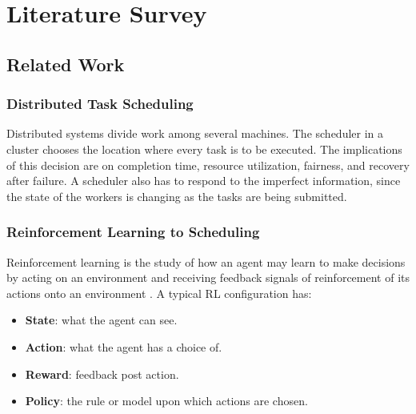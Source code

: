 %
%
%

\chapter{Literature Survey}
\label{section:lit_survey}

\section{Related Work}
\label{section:related_work}

\subsection{Distributed Task Scheduling}

Distributed systems divide work among several machines. The scheduler in a cluster chooses the location where every task is to be executed. The implications of this decision are on completion time, resource utilization, fairness, and recovery after failure. A scheduler also has to respond to the imperfect information, since the state of the workers is changing as the tasks are being submitted.

\subsection{Reinforcement Learning to Scheduling}

Reinforcement learning is the study of how an agent may learn to make decisions by acting on an environment and receiving feedback signals of reinforcement of its actions onto an environment \cite{sutton2018reinforcement}. A typical RL configuration has:

\begin{itemize}
    \item \textbf{State}: what the agent can see.
    \item \textbf{Action}: what the agent has a choice of.
    \item \textbf{Reward}: feedback post action.
    \item \textbf{Policy}: the rule or model upon which actions are chosen.
\end{itemize}

